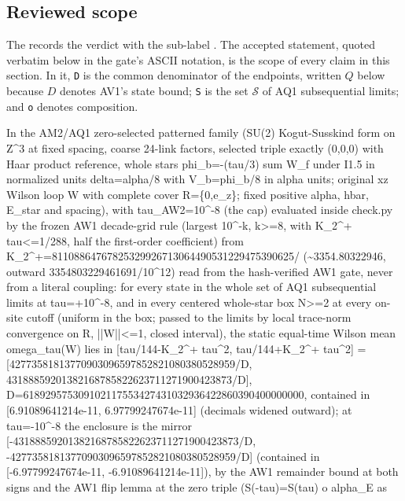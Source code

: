 \subsection{Reviewed scope}
The  records the
verdict  with the sub-label
. The accepted statement, quoted verbatim below in
the gate's ASCII notation, is the scope of every claim in this section. In it,
\texttt{D} is the common denominator of the endpoints, written $Q$ below
because $D$ denotes AV1's state bound; \texttt{S} is the set $\mathcal S$ of
AQ1 subsequential limits; and \texttt{o} denotes composition.
\begin{gatequote}
In the AM2/AQ1 zero-selected patterned family (SU(2) Kogut-Susskind form on
Z\textasciicircum{}3 at fixed spacing, coarse 24-link factors, selected triple
exactly (0,0,0) with Haar product reference, whole stars phi\_b=-(tau/3) sum
W\_f under I1.5 in normalized units delta=alpha/8 with V\_b=phi\_b/8 in alpha
units; original xz Wilson loop W with complete cover R=\{0,e\_z\}; fixed
positive alpha, hbar, E\_star and spacing), with
tau\_AW2=10\textasciicircum{}-8 (the cap) evaluated inside check.py by the
frozen AW1 decade-grid rule (largest 10\textasciicircum{}-k, k>=8, with
K\_2\textasciicircum{}+ tau<=1/288, half the first-order coefficient) from
K\_2\textasciicircum{}+=81108864767825329926713064490531229475390625/
(\textasciitilde{}3354.80322946, outward
3354803229461691/10\textasciicircum{}12) read from the hash-verified AW1 gate,
never from a literal coupling: for every state in the whole set of AQ1
subsequential limits at tau=+10\textasciicircum{}-8, and in every centered
whole-star box N>=2 at every on-site cutoff (uniform in the box; passed to the
limits by local trace-norm convergence on R, ||W||<=1, closed interval), the
static equal-time Wilson mean omega\_tau(W) lies in
[tau/144-K\_2\textasciicircum{}+ tau\textasciicircum{}2,
tau/144+K\_2\textasciicircum{}+ tau\textasciicircum{}2] =
[42773581813770903096597852821080380528959/D,
43188859201382168785822623711271900423873/D],
D=618929575309102117553427431032936422860390400000000, contained in
[6.91089641214e-11, 6.97799247674e-11] (decimals widened outward); at
tau=-10\textasciicircum{}-8 the enclosure is the mirror
[-43188859201382168785822623711271900423873/D,
-42773581813770903096597852821080380528959/D] (contained in
[-6.97799247674e-11, -6.91089641214e-11]), by the AW1 remainder bound at both
signs and the AW1 flip lemma at the zero triple (S(-tau)=S(tau) o alpha\_E as

\end{gatequote}
